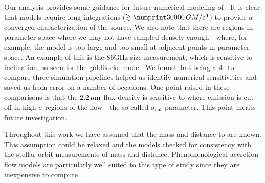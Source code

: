 Our analysis provides some guidance for future numerical modeling of \sgra.
It is clear that models require long integrations ($\gtrsim \no{30000}\,\tg$) to provide a converged characterization of the source.
We also note that there are regions in parameter space where we may not have sampled densely enough---where, for example, the model is too large and too small at adjacent points in parameter space.
An example of this is the 86GHz size measurement, which is sensitive to inclination, as seen for the goldilocks model.
We found that being able to compare three simulation pipelines helped us identify numerical sensitivities and saved us from error on a number of occasions.
One point raised in these comparisons is that the $2.2\,\mu\mathrm{m}$ flux density is sensitive to where emission is cut off in high $\sigma$ regions of the flow---the so-called $\sigma_\mathrm{cut}$ parameter.
This point merits future investigation.

Throughout this work we have assumed that the mass and distance to \sgra are known.
This assumption could be relaxed and the models checked for consistency with the stellar orbit measurements of mass and distance.
Phenomenological accretion flow models are particularly well suited to this type of study since they are inexpensive to compute \citep[e.g.,][]{2009ApJ...697...45B}.
